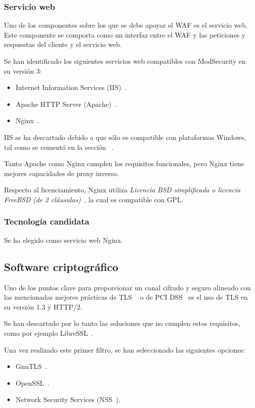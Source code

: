 \subsubsection{Servicio web}
\par Uno de los componentes sobre los que se debe apoyar el WAF es el servicio web. Este componente se comporta como un interfaz entre el WAF y las peticiones y respuestas del cliente y el servicio web.
\par Se han identificado los siguientes servicios web compatibles con  ModSecurity en su versión 3:
\begin{itemize}
  \item Internet Information Services (IIS)~\cite{iis}.
  \item Apache HTTP Server (Apache)~\cite{apache}.
  \item Nginx~\cite{nginx}.
\end{itemize}
\par IIS se ha descartado debido a que sólo es compatible con plataformas Windows, tal como se comentó en la sección ~.

\par Tanto Apache como Nginx cumplen los requisitos funcionales, pero Nginx tiene mejores capacidades de proxy inverso.

\par Respecto al licenciamiento, Nginx utiliza {\em Licencia BSD simplificada o licencia FreeBSD (de 2 cláusulas)}~\cite{wiki:SimplifiedBSDLicense}, la cual es compatible con GPL.

\subsubsection{Tecnología candidata}
\par Se ha elegido como servicio web Nginx.

\subsection{Software criptográfico}
\par Uno de los puntos clave para proporcionar un canal cifrado y seguro alineado con las mencionadas mejores prácticas de TLS ~\cite{TLSBestPractices} o de PCI DSS~\cite{pcidssrequirements} es el uso de TLS en su versión 1.3 y HTTP/2.
\par Se han descartado por lo tanto las soluciones que no cumplen estos requisitos, como por ejemplo LibreSSL~\cite{libressl}.
\par Una vez realizado este primer filtro, se han seleccionado las siguientes opciones:
\begin{itemize}
  \item GnuTLS~\cite{gnutls}.
  \item OpenSSL~\cite{openssl}.
  \item Network Security Services (NSS~\cite{nss}).
\end{itemize}

